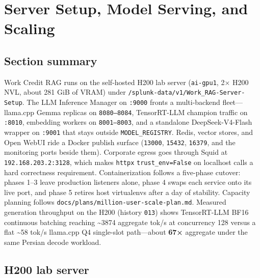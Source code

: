 \chapter{Server Setup, Model Serving, and Scaling}\label{server-setup-model-serving-and-scaling}

\section{Section summary}\label{section-summary}

Work Credit RAG runs on the self-hosted H200 lab server (\texttt{ai-gpu1}, 2× H200 NVL, about 281 GiB of VRAM) under \texttt{/splunk-data/v1/Work\_RAG-Server-Setup}. The LLM Inference Manager on \texttt{:9000} fronts a multi-backend fleet---llama.cpp Gemma replicas on \texttt{8080–8084}, TensorRT-LLM champion traffic on \texttt{:8010}, embedding workers on \texttt{8001–8003}, and a standalone DeepSeek-V4-Flash wrapper on \texttt{:9001} that stays outside \texttt{MODEL\_REGISTRY}. Redis, vector stores, and Open WebUI ride a Docker publish surface (\texttt{13000}, \texttt{15432}, \texttt{16379}, and the monitoring ports beside them). Corporate egress goes through Squid at \texttt{192.168.203.2:3128}, which makes \texttt{httpx} \texttt{trust\_env=False} on localhost calls a hard correctness requirement. Containerization follows a five-phase cutover: phases 1--3 leave production listeners alone, phase 4 swaps each service onto its live port, and phase 5 retires host virtualenvs after a day of stability. Capacity planning follows \texttt{docs/plans/million-user-scale-plan.md}. Measured generation throughput on the H200 (history \texttt{013}) shows TensorRT-LLM BF16 continuous batching reaching \textasciitilde3874 aggregate tok/s at concurrency 128 versus a flat \textasciitilde58 tok/s llama.cpp Q4 single-slot path---about \textbf{67×} aggregate under the same Persian decode workload.

\section{H200 lab server}\label{h200-lab-server}

